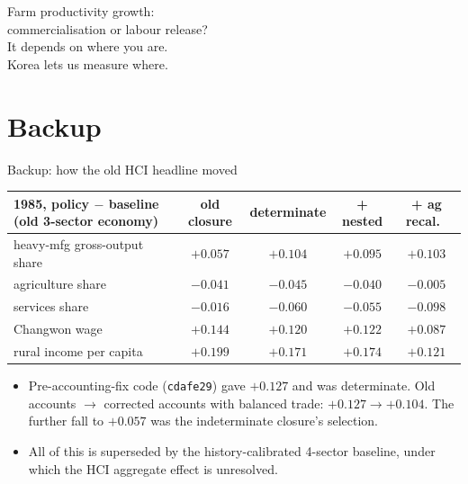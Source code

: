 \documentclass[10pt,aspectratio=169]{beamer}
\begin{document}
\begin{frame}[standout]
  Farm productivity growth: \\ commercialisation or labour release?\\[0.5em]
  \normalsize It depends on where you are.\\
  Korea lets us measure where.
\end{frame}

\appendix
{}
\section{Backup}

\begin{frame}{Backup: how the old HCI headline moved}
  \footnotesize
  \centering
  \begin{tabular}{@{}lcccc@{}}
    \toprule
    1985, policy $-$ baseline (old 3-sector economy) & old closure & determinate & + nested & + ag recal.\ \\
    \midrule
    heavy-mfg gross-output share & $+0.057$ & $+0.104$ & $+0.095$ & $+0.103$ \\
    agriculture share & $-0.041$ & $-0.045$ & $-0.040$ & $-0.005$ \\
    services share & $-0.016$ & $-0.060$ & $-0.055$ & $-0.098$ \\
    Changwon wage & $+0.144$ & $+0.120$ & $+0.122$ & $+0.087$ \\
    rural income per capita & $+0.199$ & $+0.171$ & $+0.174$ & $+0.121$ \\
    \bottomrule
  \end{tabular}
  \vspace{0.5em}
  \begin{itemize}\small
    \item Pre-accounting-fix code (\texttt{cdafe29}) gave $+0.127$ and was determinate. Old
          accounts $\to$ corrected accounts with balanced trade: $+0.127\to+0.104$. The
          further fall to $+0.057$ was the indeterminate closure's selection.
    \item All of this is superseded by the history-calibrated 4-sector baseline, under
          which the HCI aggregate effect is unresolved.
  \end{itemize}
\end{frame}
\end{document}
